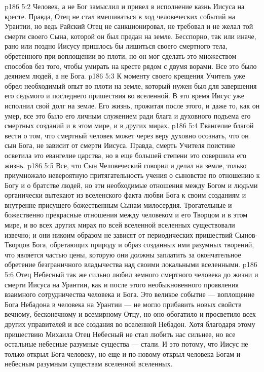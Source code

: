 \vs p186 5:2 Человек, а не Бог замыслил и привел в исполнение казнь Иисуса на кресте. Правда, Отец не стал вмешиваться в ход человеческих событий на Урантии, но ведь Райский Отец не санкционировал, не требовал и не желал той смерти своего Сына, которой он был предан на земле. Бесспорно, так или иначе, рано или поздно Иисусу пришлось бы лишиться своего смертного тела, обретенного при воплощении во плоти, но он мог сделать это множеством способов без того, чтобы умирать на кресте рядом с двумя ворами. Все это было деянием людей, а не Бога.
\vs p186 5:3 К моменту своего крещения Учитель уже обрел необходимый опыт во плоти на земле, который нужен был для завершения его седьмого и последнего пришествия во вселенной. В это время Иисус уже исполнил свой долг на земле. Его жизнь, прожитая после этого, и даже то, как он умер, все это было его личным служением ради блага и духовного подъема его смертных созданий и в этом мире, и в других мирах.
\vs p186 5:4 Евангелие благой вести о том, что смертный человек может через веру духовно осознать, что он сын Бога, не зависит от смерти Иисуса. Правда, смерть Учителя поистине осветила это евангелие царства, но в еще большей степени это совершила его жизнь.
\vs p186 5:5 Все, что Сын Человеческий говорил и делал на земле, только приумножало невероятную притягательность учения о сыновстве по отношению к Богу и о братстве людей, но эти необходимые отношения между Богом и людьми органически вытекают из вселенского факта любви Бога к своим созданиям и внутренне присущего божественным Сынам милосердия. Трогательные и божественно прекрасные отношения между человеком и его Творцом и в этом мире, и во всех других мирах по всей вселенной вселенных существовали извечно; и они никоим образом не зависят от периодических пришествий Сынов\hyp{}Творцов Бога, обретающих природу и образ созданных ими разумных творений, что является частью цены, которую они должны заплатить за окончательное обретение безграничного владычества над своими локальными вселенными.
\vs p186 5:6 Отец Небесный так же сильно любил земного смертного человека до жизни и смерти Иисуса на Урантии, как и после этого необыкновенного проявления взаимного сотрудничества человека и Бога. Это великое событие --- воплощение Бога Небадона в человека на Урантии --- не могло прибавить новых свойств вечному, бесконечному и всемирному Отцу, но оно обогатило и просветило всех других управителей и все создания во вселенной Небадон. Хотя благодаря этому пришествию Михаила Отец Небесный не стал любить нас сильнее, но все остальные небесные разумные существа --- стали. И это потому, что Иисус не только открыл Бога человеку, но еще и по\hyp{}новому открыл человека Богам и небесным разумным существам вселенной вселенных.
